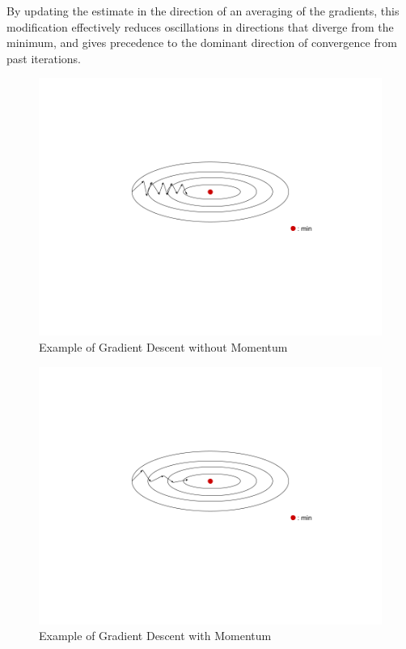 By updating the estimate in the direction of an averaging of the gradients, this modification effectively reduces oscillations in directions that diverge from the minimum, and gives precedence to the dominant direction of convergence from past iterations.
\begin{figure}[H]
  \centering
  \includegraphics[width=\linewidth]{Figures/Fig1.png}
  \setlength{\abovecaptionskip}{-102pt}  
  \setlength{\belowcaptionskip}{-5pt}
  \caption{Example of Gradient Descent without Momentum}
  \label{fig:image1}
\end{figure}
\begin{figure}[H]
  \centering
  \includegraphics[width=\linewidth]{Figures/Fig2.png}
  \setlength{\abovecaptionskip}{-102pt}  
  \setlength{\belowcaptionskip}{-5pt}
  \caption{Example of Gradient Descent with Momentum}
  \label{fig:image1}
\end{figure}


